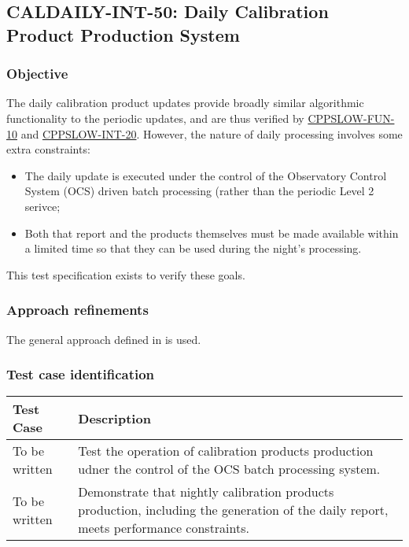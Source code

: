 \subsection{CALDAILY-INT-50: Daily Calibration Product Production System}
\label{caldaily-int-50}

\subsubsection{Objective}

The daily calibration product updates provide broadly similar algorithmic
functionality to the periodic updates, and are thus verified by
\hyperref[cppslow-fun-10]{CPPSLOW-FUN-10} and
\hyperref[cppslow-int-20]{CPPSLOW-INT-20}. However, the nature of daily
processing involves some extra constraints:

\begin{itemize}

  \item{The daily update is executed under the control of the Observatory
  Control System (OCS) driven batch processing (rather than the periodic Level
  2 serivce;}

  \item{Both that report and the products themselves must be made available
  within a limited time so that they can be used during the night's
  processing.}

\end{itemize}

This test specification exists to verify these goals.

\subsubsection{Approach refinements}

The general approach defined in  is used.

\subsubsection{Test case identification}

\begin{longtable} {|p{}|p{}|}\hline
\textbf{Test Case}  & \textbf{Description} \\\hline
To be written & Test the operation of calibration products production udner the control of the OCS batch processing system.\\\hline
To be written & Demonstrate that nightly calibration products production, including the generation of the daily report, meets performance constraints.\\\hline
\end{longtable}
